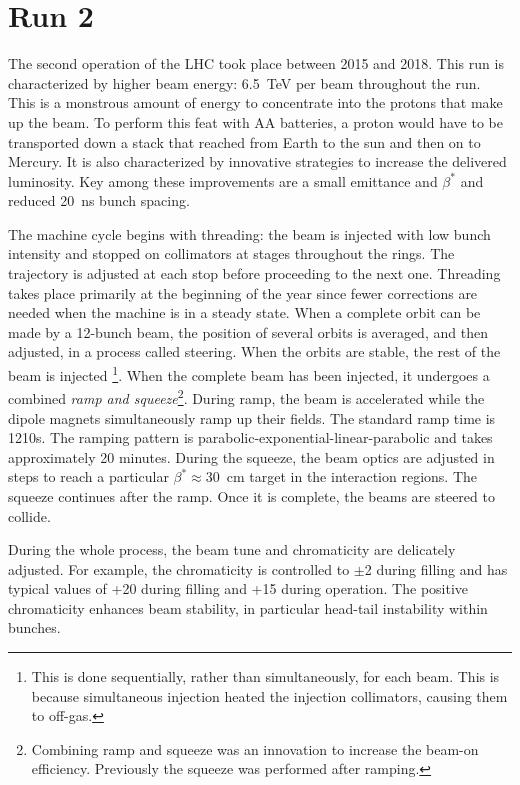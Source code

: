 \section{Run 2}

The second operation of the LHC took place between 2015 and 2018.
This run is characterized by higher beam energy: 6.5~TeV per beam throughout the run.
This is a monstrous amount of energy to concentrate into the protons that make up the beam.
To perform this feat with AA batteries, a proton would have to be transported down a stack that reached from Earth to the sun and then on to Mercury.
It is also characterized by innovative strategies to increase the delivered luminosity.
Key among these improvements are a small emittance and $\beta^*$ and reduced 20~ns bunch spacing.

The machine cycle begins with threading: the beam is injected with low bunch intensity and stopped on collimators at stages throughout the rings.
The trajectory is adjusted at each stop before proceeding to the next one.
Threading takes place primarily at the beginning of the year since fewer corrections are needed when the machine is in a steady state.
When a complete orbit can be made by a 12-bunch beam, the position of several orbits is averaged, and then adjusted, in a process called steering.
When the orbits are stable, the rest of the beam is injected \footnote{This is done sequentially, rather than simultaneously, for each beam. This is because simultaneous injection heated the injection collimators, causing them to off-gas.}.
When the complete beam has been injected, it undergoes a combined \emph{ramp and squeeze}\footnote{Combining ramp and squeeze was an innovation to increase the beam-on efficiency. Previously the squeeze was performed after ramping.}.
During ramp, the beam is accelerated while the dipole magnets simultaneously ramp up their fields.
The standard ramp time is 1210s. 
The ramping pattern is parabolic-exponential-linear-parabolic and takes approximately 20 minutes. 
During the squeeze, the beam optics are adjusted in steps to reach a particular $\beta^*\approx30$~cm target in the interaction regions.
The squeeze continues after the ramp.
Once it is complete, the beams are steered to collide.

During the whole process, the beam tune and chromaticity are delicately adjusted.
For example, the chromaticity is controlled to $\pm$2 during filling and has typical values of +20 during filling and +15 during operation. \cite{lhcRun2}
The positive chromaticity enhances beam stability, in particular head-tail instability within bunches.


